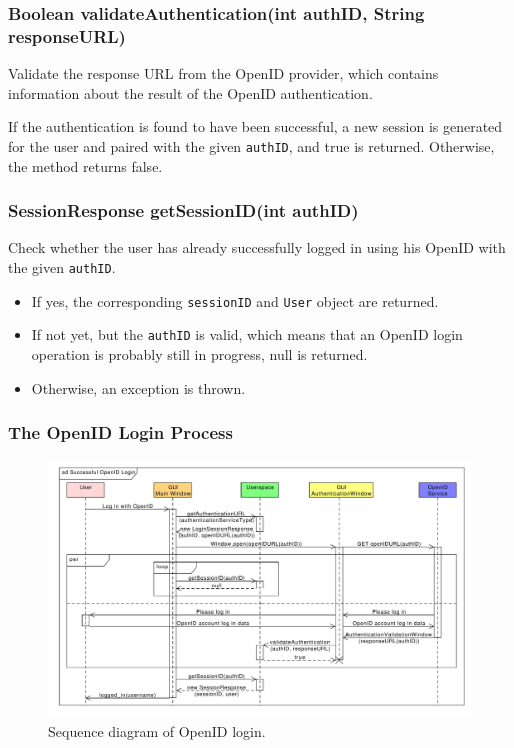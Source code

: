 \subsubsection{Boolean validateAuthentication(int authID, String responseURL)}

Validate the response URL from the OpenID provider, which contains information about the result of the OpenID authentication.

If the authentication is found to have been successful, a new session is generated for the user and paired with the given {\tt authID}, and true is returned.
Otherwise, the method returns false.

\subsubsection{SessionResponse getSessionID(int authID)}

Check whether the user has already successfully logged in using his OpenID with the given {\tt authID}.

\begin{itemize}
\item If yes, the corresponding {\tt sessionID} and {\tt User} object are returned.
\item If not yet, but the {\tt authID} is valid, which means that an OpenID login operation is probably still in progress, null is returned.
\item Otherwise, an exception is thrown.
\end{itemize}

\subsubsection{The OpenID Login Process}
\label{subsubsec:gui:openid}

\begin{figure}[h]
\begin{center}
\includegraphics[scale=0.55, angle=90]{figures/openid_login_sequence.pdf}
\end{center}
\caption{Sequence diagram of OpenID login.}\label{rpc:sd:openid_login}
\end{figure}

